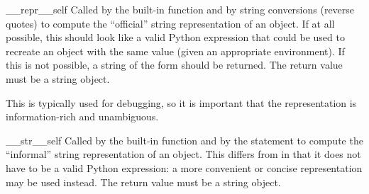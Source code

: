 \begin{methoddesc}[object]{__repr__}{self}
Called by the  built-in function
and by string conversions (reverse quotes) to compute the ``official''
string representation of an object.  If at all possible, this should
look like a valid Python expression that could be used to recreate an
object with the same value (given an appropriate environment).  If
this is not possible, a string of the form  should be returned.  The return value must be a
string object.

This is typically used for debugging, so it is important that the
representation is information-rich and unambiguous.
\end{methoddesc}

\begin{methoddesc}[object]{__str__}{self}
Called by the  built-in function and
by the  statement to compute the
``informal'' string representation of an object.  This differs from
 in that it does not have to be a valid Python
expression: a more convenient or concise representation may be used
instead.  The return value must be a string object.
\end{methoddesc}

